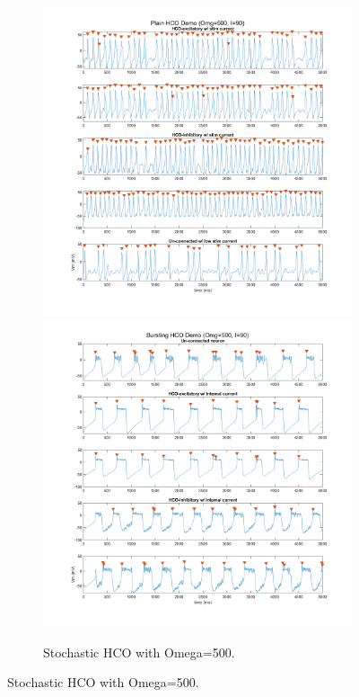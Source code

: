 \documentclass[
]{article}
\begin{document}
\begin{figure} \ContinuedFloat
  \centering
  \begin{subfigure}[b]{\textwidth}
    \includegraphics[width=.49\textwidth]{figs/old/Fx1_D_HCO_Om5e2_NB.png}         
    \includegraphics[width=.49\textwidth]{figs/old/Fx1_D_HCO_Om5e2_B.png}
    \vspace{-0.5cm} \caption{Stochastic HCO with Omega=500.}
  \end{subfigure}
\end{figure}
\end{document}
